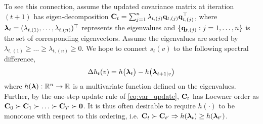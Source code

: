 To see this connection, assume the updated covariance matrix at iteration $(t+1)$ has eigen-decomposition ${\mathbf C}_t = \sum_{j=1}^n \lambda_{t,(j)}\mathbf{q}_{t,(j)} \mathbf{q}_{t,(j)}^\top$, where $\boldsymbol{\lambda}_t=(\lambda_{t,(1)}, \dotsc,\lambda_{t,(n)})^\top$ represents the eigenvalues and  $\{\mathbf{q}_{t,(j)}:j=1,\dotsc,n\}$ is the set of corresponding eigenvectors. Assume the eigenvalues are sorted by $\lambda_{t,(1)}\geq\dotsc\geq\lambda_{t,(n)}\geq0$.
We hope to connect $s_t(v)$ to the following spectral difference,
\begin{equation}
	\Delta h_t(v) = 
	h\bigl(\boldsymbol{\lambda}_{t}\bigr)
	-
	h\bigl(\boldsymbol{\lambda}_{t+1\mid v}\bigr) 
\end{equation}
where $h(\boldsymbol{\lambda}):\mathbb{R}^n\to\mathbb{R}$ is a multivariate function defined on the eigenvalues.
Further, by the one-step update rule of \eqref{eq:var_update}, ${\mathbf C}_t$ has Loewner order as 
${\mathbf C}_0\succ{\mathbf C}_1\succ\dotsc\succ{\mathbf C}_T\succ\mathbf{0}$. 
It is thus often desirable to require $h(\cdot)$ to be monotone with respect to this ordering, i.e. ${\mathbf C}_t\succ{\mathbf C}_{t'} \Rightarrow h(\boldsymbol{\lambda}_t)\geq h(\boldsymbol{\lambda}_{t'})$.



